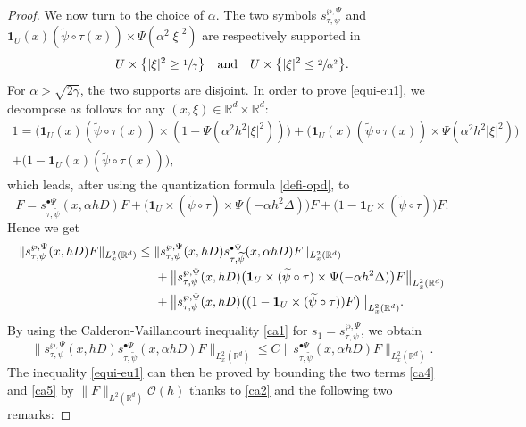 \documentclass[10pt]{amsart}
\newcommand{\sbullet}{{\scriptscriptstyle\bullet}}
\theoremstyle{theorem}
\theoremstyle{definition}
\newcommand\R{\mathbb{R}}
\newcommand\pun{\mathbf{1}}
\begin{document}
\begin{proof}
We now turn to the choice of $\alpha$. The two symbols $s_{\tau,\psi}^{\wp,\Psi}$ and $\pun_{U}(x)(\widetilde{\psi}\circ \tau(x))\times \Psi(\alpha^2 |\xi|^2)$ are respectively supported in
\begin{equation*} U\times \bigl\{|\xi|^2\geq \sfrac{1}{\gamma}\bigr\} \quad \text{and} \quad U\times \bigl\{ |\xi|^2 \leq \sfrac{2}{\alpha^2}\bigr\}.
\end{equation*}
For $\alpha>\sqrt{2\gamma}$, the two supports are disjoint.
In order to prove \eqref{equi-eu1}, we decompose as follows for any $(x,\xi)\in \R^d\times \R^d$:
\begin{multline*}
1 = \Big(\pun_{U}(x) (\widetilde{\psi}\circ \tau(x)) \times (1-\Psi(\alpha^2 h^2 |\xi|^2))\Big)+\Big(\pun_{U}(x)
(\widetilde{\psi}\circ \tau(x))\times \Psi(\alpha^2 h^2 |\xi|^2)\Big)\\
+\Big(1-\pun_{U}(x)(\widetilde{\psi}\circ \tau(x)) \Big),
\end{multline*}
which leads, after using the quantization formula \eqref{defi-opd}, to
\begin{equation}\label{ca3}
F= s_{\tau,\widetilde{\psi}}^{\sbullet\Psi}(x,\alpha hD)F + \bigl(\pun_{U}\times (\widetilde{\psi}\circ \tau)\times \Psi(-\alpha h^2 \Delta) \bigr)F 
+ \bigl(1-\pun_{U}\times (\widetilde{\psi}\circ\tau) \bigr)F.
\end{equation}
Hence we get
\begin{align}\nonumber
\|s_{\tau,\psi}^{\wp,\Psi}(x,hD)F\|_{L_x^2(\R^d)} &\leq \|s_{\tau,\psi}^{\wp,\Psi}(x,hD) s_{\tau,\widetilde{\psi}}^{\sbullet\Psi}(x,\alpha h D) F\|_{L_x^2(\R^d)} \\ \label{ca4}
&\hspace*{5mm} + \bigl\| s_{\tau,\psi}^{\wp,\Psi}(x,hD)\bigl(\pun_{U}\times (\widetilde{\psi}\circ \tau)\times \Psi(-\alpha h^2 \Delta)\bigr) F \bigr\|_{L_x^2(\R^d)}\\ \label{ca5}
& \hspace*{5mm}+ \bigl\|s_{\tau,\psi}^{\wp,\Psi}(x,hD)\bigl((1-\pun_{U}\times (\widetilde{\psi}\circ \tau))F\bigl)\bigl\|_{L_x^2(\R^d)}.
\end{align}
By using the Calderon-Vaillancourt inequality \eqref{ca1} for $s_1=s_{\tau,\psi}^{\wp,\Psi}$, we obtain
\begin{equation*}
\|s_{\tau,\psi}^{\wp,\Psi}(x,hD) s_{\tau,\widetilde{\psi}}^{\sbullet\Psi}(x,\alpha h D) F\|_{L_x^2(\R^d)}
\leq C\|s_{\tau,\widetilde{\psi}}^{\sbullet\Psi}(x,\alpha h D) F\|_{L_x^2(\R^d)}.
\end{equation*}
The inequality \eqref{equi-eu1} can then be proved by bounding the two terms \eqref{ca4} and \eqref{ca5} by $\|F\|_{L^2(\R^d)}\mathcal{O}(h)$ thanks to \eqref{ca2} and the following two remarks:

\end{proof}
\end{document}
